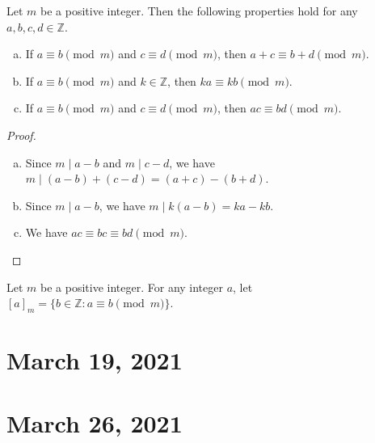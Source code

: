 \documentclass[11pt]{article}
\newcommand{\ZZ}{\mathbb{Z}}
\begin{document}
\begin{proposition}
  Let $m$ be a positive integer.
  Then the following properties hold for any $a, b, c, d \in \ZZ$.
  \begin{enumerate}[(a)]
    \item If $a \equiv b \pmod m$ and $c \equiv d \pmod m$, then $a + c \equiv b + d \pmod m$.
    \item If $a \equiv b \pmod m$ and $k \in \ZZ$, then $ka \equiv kb \pmod m$.
    \item If $a \equiv b \pmod m$ and $c \equiv d \pmod m$, then $ac \equiv bd \pmod m$.
  \end{enumerate}
\end{proposition}
\begin{proof}
  \leavevmode
  \begin{enumerate}[(a)]
    \item Since $m \mid a - b$ and $m \mid c - d$, we have $m \mid (a - b) + (c - d) = (a + c) - (b + d)$.
    \item Since $m \mid a - b$, we have $m \mid k(a - b) = ka - kb$.
    \item We have $ac \equiv bc \equiv bd \pmod m$.
    \qedhere
  \end{enumerate}
\end{proof}

\begin{definition}
  Let $m$ be a positive integer.
  For any integer $a$, let $[a]_m = \{b \in \ZZ: a \equiv b \pmod m\}$.
\end{definition}

\section{March 19, 2021}

\section{March 26, 2021}
\end{document}
